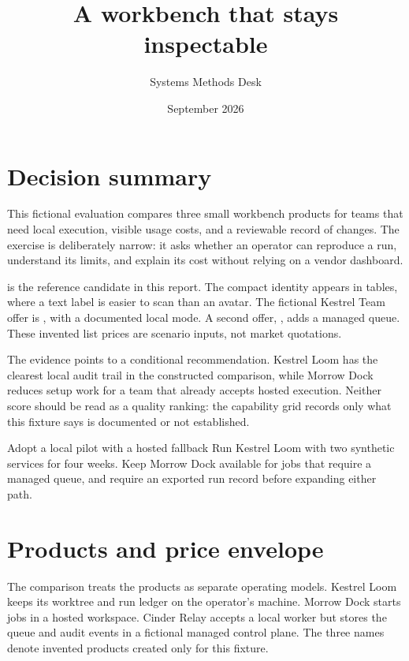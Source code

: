 \documentclass[publication-type=technical-report,theme=operator]{reportkit}
\title{A workbench that stays inspectable}
\author{Systems Methods Desk}
\date{September 2026}
\begin{document}
\maketitle

\section{Decision summary}
This fictional evaluation compares three small workbench products for teams
that need local execution, visible usage costs, and a reviewable record of
changes. The exercise is deliberately narrow: it asks whether an operator can
reproduce a run, understand its limits, and explain its cost without relying
on a vendor dashboard.

 is the reference
candidate in this report. The compact identity  appears in tables, where a text label is easier to scan than an avatar.
The fictional Kestrel Team offer is , with
 a documented local mode. A second offer,
, adds a managed queue. These invented list
prices are scenario inputs, not market quotations.

The evidence points to a conditional recommendation. Kestrel Loom has the
clearest local audit trail in the constructed comparison, while Morrow Dock
reduces setup work for a team that already accepts hosted execution. Neither
score should be read as a quality ranking: the capability grid records only
what this fixture says is documented or not established.

\begin{decisionpoint}{Adopt a local pilot with a hosted fallback}
Run Kestrel Loom with two synthetic services for four weeks. Keep Morrow Dock
available for jobs that require a managed queue, and require an exported
run record before expanding either path.
\end{decisionpoint}

\clearpage
\section{Products and price envelope}
The comparison treats the products as separate operating models. Kestrel Loom
keeps its worktree and run ledger on the operator's machine. Morrow Dock
starts jobs in a hosted workspace. Cinder Relay accepts a local worker but
stores the queue and audit events in a fictional managed control plane. The
three names denote invented products created only for this fixture.
\end{document}
